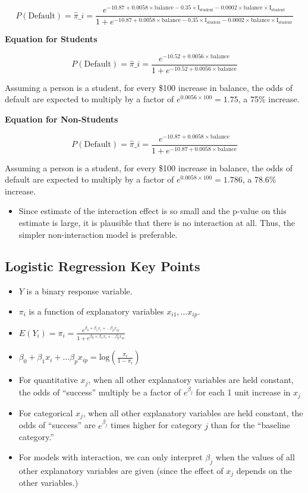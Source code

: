 \documentclass[
  letterpaper,
  DIV=11,
  numbers=noendperiod]{scrreprt}
\providecommand{\tightlist}{%
  \setlength{\itemsep}{0pt}\setlength{\parskip}{0pt}}\usepackage{longtable,booktabs,array}
\begin{document}
\[P(\text{Default}) = \hat{\pi}\_i = \frac{e^{-10.87+0.0058\times\text{balance}-0.35\times\text{I}_{\text{student}}-0.0002\times\text{balance}\times{\text{I}_{\text{student}}}}}{1+e^{-10.87+0.0058\times\text{balance}-0.35\times\text{I}_{\text{student}}-0.0002\times\text{balance}\times{\text{I}_{\text{student}}}}}
\]

\textbf{Equation for Students}

\[P(\text{Default}) = \hat{\pi}\_i = \frac{e^{-10.52+0.0056\times\text{balance}}}{1+e^{-10.52+0.0056\times\text{balance}}}
\]

Assuming a person is a student, for every \$100 increase in balance, the
odds of default are expected to multiply by a factor of
\(e^{0.0056\times 100}=1.75\), a 75\% increase.

\textbf{Equation for Non-Students}

\[
P(\text{Default}) = \hat{\pi}\_i = \frac{e^{-10.87+0.0058\times\text{balance}}}{1+e^{-10.87+0.0058\times\text{balance}}}
\]

Assuming a person is a student, for every \$100 increase in balance, the
odds of default are expected to multiply by a factor of
\(e^{0.0058\times 100}=1.786\), a 78.6\% increase.

\begin{itemize}
\tightlist
\item
  Since estimate of the interaction effect is so small and the p-value
  on this estimate is large, it is plausible that there is no
  interaction at all. Thus, the simpler non-interaction model is
  preferable.
\end{itemize}

\subsection{Logistic Regression Key
Points}\label{logistic-regression-key-points}

\begin{itemize}
\item
  \(Y\) is a binary response variable.
\item
  \(\pi_i\) is a function of explanatory variables
  \(x_{i1}, \ldots x_{ip}\).
\item
  \(E(Y_i) = \pi_i = \frac{e^{\beta_0+\beta_1x_i + \ldots\beta_px_{ip}}}{1+e^{\beta_0+\beta_1x_i + \ldots\beta_px_{ip}}}\)
\item
  \(\beta_0+\beta_1x_i + \ldots\beta_px_{ip} = \text{log}\left(\frac{\pi_i}{1-\pi_i}\right)\)
\item
  For quantitative \(x_j\), when all other explanatory variables are
  held constant, the odds of ``success'' multiply be a factor of
  \(e^{\beta_j}\) for each 1 unit increase in \(x_j\)
\item
  For categorical \(x_j\), when all other explanatory variables are held
  constant, the odds of ``success'' are \(e^{\beta_j}\) times higher for
  category \(j\) than for the ``baseline category.''
\item
  For models with interaction, we can only interpret \(\beta_j\) when
  the values of all other explanatory variables are given (since the
  effect of \(x_j\) depends on the other variables.)
\end{itemize}
\end{document}
